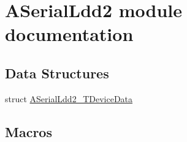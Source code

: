 \hypertarget{group___a_serial_ldd2__module}{\section{A\-Serial\-Ldd2 module documentation}
\label{group___a_serial_ldd2__module}
}
\subsection*{Data Structures}
\begin{DoxyCompactItemize}
\item 
struct \hyperlink{struct_a_serial_ldd2___t_device_data}{A\-Serial\-Ldd2\-\_\-\-T\-Device\-Data}
\end{DoxyCompactItemize}
\subsection*{Macros}
